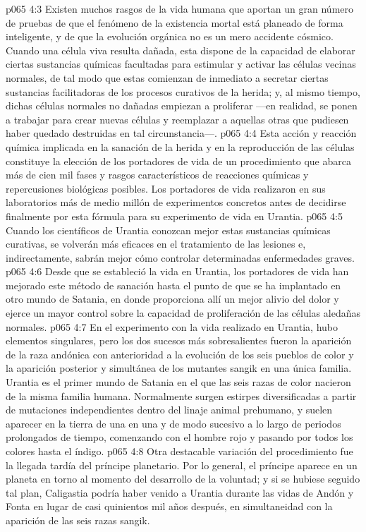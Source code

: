 \vs p065 4:3 \pc Existen muchos rasgos de la vida humana que aportan un gran número de pruebas de que el fenómeno de la existencia mortal está planeado de forma inteligente, y de que la evolución orgánica no es un mero accidente cósmico. Cuando una célula viva resulta dañada, esta dispone de la capacidad de elaborar ciertas sustancias químicas facultadas para estimular y activar las células vecinas normales, de tal modo que estas comienzan de inmediato a secretar ciertas sustancias facilitadoras de los procesos curativos de la herida; y, al mismo tiempo, dichas células normales no dañadas empiezan a proliferar ---en realidad, se ponen a trabajar para crear nuevas células y reemplazar a aquellas otras que pudiesen haber quedado destruidas en tal circunstancia---.
\vs p065 4:4 Esta acción y reacción química implicada en la sanación de la herida y en la reproducción de las células constituye la elección de los portadores de vida de un procedimiento que abarca más de cien mil fases y rasgos característicos de reacciones químicas y repercusiones biológicas posibles. Los portadores de vida realizaron en sus laboratorios más de medio millón de experimentos concretos antes de decidirse finalmente por esta fórmula para su experimento de vida en Urantia.
\vs p065 4:5 Cuando los científicos de Urantia conozcan mejor estas sustancias químicas curativas, se volverán más eficaces en el tratamiento de las lesiones e, indirectamente, sabrán mejor cómo controlar determinadas enfermedades graves.
\vs p065 4:6 Desde que se estableció la vida en Urantia, los portadores de vida han mejorado este método de sanación hasta el punto de que se ha implantado en otro mundo de Satania, en donde proporciona allí un mejor alivio del dolor y ejerce un mayor control sobre la capacidad de proliferación de las células aledañas normales.
\vs p065 4:7 \pc En el experimento con la vida realizado en Urantia, hubo elementos singulares, pero los dos sucesos más sobresalientes fueron la aparición de la raza andónica con anterioridad a la evolución de los seis pueblos de color y la aparición posterior y simultánea de los mutantes sangik en una única familia. Urantia es el primer mundo de Satania en el que las seis razas de color nacieron de la misma familia humana. Normalmente surgen estirpes diversificadas a partir de mutaciones independientes dentro del linaje animal prehumano, y suelen aparecer en la tierra de una en una y de modo sucesivo a lo largo de periodos prolongados de tiempo, comenzando con el hombre rojo y pasando por todos los colores hasta el índigo.
\vs p065 4:8 Otra destacable variación del procedimiento fue la llegada tardía del príncipe planetario. Por lo general, el príncipe aparece en un planeta en torno al momento del desarrollo de la voluntad; y si se hubiese seguido tal plan, Caligastia podría haber venido a Urantia durante las vidas de Andón y Fonta en lugar de casi quinientos mil años después, en simultaneidad con la aparición de las seis razas sangik.
